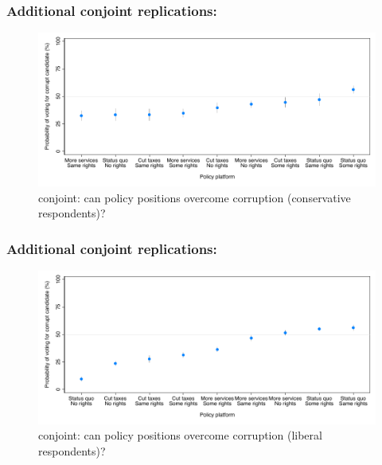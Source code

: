 \documentclass[usenames,dvipsnames]{beamer}
\begin{document}
\begin{frame}[label=fz_conjoint1, noframenumbering]
\frametitle{Additional conjoint replications: \citet{franchino2015voting} \hyperlink{conjoint}{}}

\begin{figure}[!htb]
\begin{centering}
\includegraphics[scale=0.7]{../figs/fz_margins_right.pdf}
\caption{\citet{franchino2015voting} conjoint: can policy positions overcome corruption (conservative respondents)?}
\label{fig: funnel_re_survey}
\end{centering}
\end{figure}

\end{frame}


\begin{frame}[label=fz_conjoint2, noframenumbering]
\frametitle{Additional conjoint replications: \citet{franchino2015voting} \hyperlink{conjoint}{}}

\begin{figure}[!htb]
\begin{centering}
\includegraphics[scale=0.7]{../figs/fz_margins_left.pdf}
\caption{\citet{franchino2015voting} conjoint: can policy positions overcome corruption (liberal respondents)?}
\label{fig: funnel_re_survey}
\end{centering}
\end{figure}

\end{frame}



\end{document}
